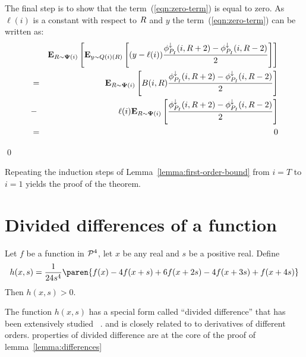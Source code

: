 \documentclass{article}[12pt]
\begin{document}
\begin{enumerate}
The final step is to show that the term~(\ref{eqn:zero-term}) is equal
to zero. As $\ell(i)$ is a constant with respect to $\R$ and $y$ the
term~(\ref{eqn:zero-term}) can be written as:
\begin{eqnarray}
&&{\bf E}_{R \sim {\bf \Psi}(i)}\left[ {\bf E}_{y \sim Q(i)(R)}\left[ (y-\ell(i))
   \frac{\phi_{P_I}^{\downarrow}(i,R+2)-\phi_{P_I}^{\downarrow}(i,R-2)}{2} \right] \right]\\
&=&
{\bf E}_{R \sim {\bf \Psi}(i)}\left[ B(i,R)
    \frac{\phi_{P_I}^{\downarrow}(i,R+2)-\phi_{P_I}^{\downarrow}(i,R-2)}{2} \right]\\
  &-& \ell(i) {\bf E}_{R \sim {\bf \Psi}(i)}\left[ 
    \frac{\phi_{P_I}^{\downarrow}(i,R+2)-\phi_{P_I}^{\downarrow}(i,R-2)}{2} \right]\\
  &=& 0
\end{eqnarray}
\end{enumerate}
\qed

Repeating the induction steps of Lemma~\ref{lemma:first-order-bound}
from $i=T$ to $i=1$ yields the proof of the theorem.


\section{Divided differences of a function} \label{sec:divdiff}

\begin{lemma} \label{lemma:differences}
Let $f$ be a function in ${\cal P}^{4}$, let $x$ be any real and $s$ be a positive real. Define
\begin{equation}
  h(x,s) =  \frac{1}{24s^4} \paren{f(x)- 4f(x+s)+ 6f(x+2s)-
    4f(x+3s)+ f(x+4s)}
\end{equation}
Then $h(x,s)>0$.
\end{lemma}

The function $h(x,s)$ has a special form called ``divided difference''
that has been extensively studied ~\cite{popoviciu1965certaines,butt2016generalization, de2005divided}.
and is closely related to to derivatives of different orders. properties of divided difference are at the core of the proof of lemma~\ref{lemma:differences}

\iffalse
We conclude that if $\pot(t',\R)$ has a strictly positive fourth
derivative then $\pot_{k+1}(t,\R) > \pot_{k}(t,\R)$ for all $\R$, proving
the first part of the lemma.

The second part of the lemma follows from the fact that
both $\pot_{k+1}(t,\R)$ and $\pot_{k}(t,\R)$ are convex combinations of
$\pot(t,\R)$ and therefor retain their continuity and convexity properties.

A function $\finalPot{}$ that satisfies
inequality~\ref{eqn:4thOrderConvex} is said to be {\em 4'th order convex}
(see details in in~\cite{butt2016generalization}).
\fi
\end{document}

